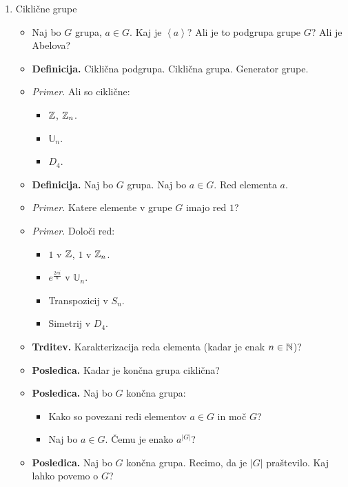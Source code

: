 \begin{enumerate}
    \newpage
    \item Ciklične grupe
    \begin{itemize}
        \item Naj bo $G$ grupa, $a \in G$. Kaj je $\left\langle a \right\rangle $? Ali je to podgrupa grupe $G$? Ali je Abelova?
        \item \colorbox{purple!30}{\textbf{Definicija.}} Ciklična podgrupa. Ciklična grupa. Generator grupe.
        \item \colorbox{yellow!30}{\emph{Primer.}} Ali so ciklične: 
        \begin{itemize}
            \item $\mathbb{Z}$, $\mathbb{Z}_n$.
            \item $\mathbb{U}_n$.
            \item $D_4$.
        \end{itemize}
        \item \colorbox{purple!30}{\textbf{Definicija.}} Naj bo $G$ grupa. Naj bo $a \in G$. Red elementa $a$.
        \item \colorbox{yellow!30}{\emph{Primer.}} Katere elemente v grupe $G$ imajo red $1$?
        \item \colorbox{yellow!30}{\emph{Primer.}} Določi red:
        \begin{itemize}
            \item $1$ v $\mathbb{Z}$, $1$ v $\mathbb{Z}_n$.
            \item $e^{\frac{2 \pi i}{n}}$ v $\mathbb{U}_n$.
            \item Transpozicij v $S_n$.
            \item Simetrij v $D_4$.
        \end{itemize}
        \item \colorbox{blue!30}{\textbf{Trditev.}} Karakterizacija reda elementa (kadar je enak $n \in \mathbb{N}$)?
        \item \colorbox{orange!30}{\textbf{Posledica.}} Kadar je končna grupa ciklična?
        \item \colorbox{orange!30}{\textbf{Posledica.}} Naj bo $G$ končna grupa:
        \begin{itemize}
            \item Kako so povezani redi elementov $a \in G$ in moč $G$?
            \item Naj bo $a \in G$. Čemu je enako $a^{|G|}$?
        \end{itemize}    
        \item \colorbox{orange!30}{\textbf{Posledica.}} Naj bo $G$ končna grupa. Recimo, da je $|G|$ praštevilo. Kaj lahko povemo o $G$?
    \end{itemize}


\end{enumerate}
